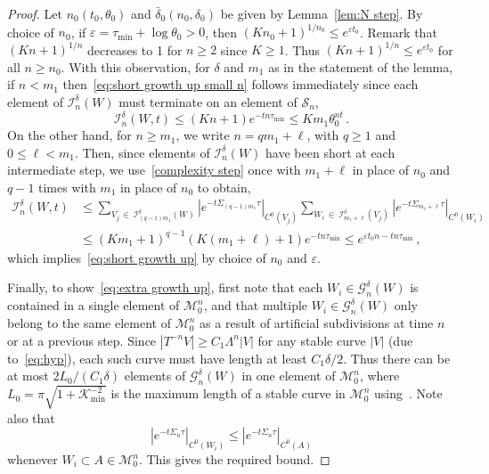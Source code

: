 \documentclass[AHL,Unicode,longabstracts,published]{cedram}
\newcommand{\cG}{\mathcal{G}}
\newcommand{\cI}{\mathcal{I}}
\newcommand{\cK}{\mathcal{K}}
\newcommand{\MM}{\mathcal{M}}
\newcommand{\cS}{\mathcal{S}}
\newcommand{\ve}{\varepsilon}
\begin{document}
\begin{proof}
Let $n_0(t_0,\theta_0)$ and $\bar\delta_0(n_0,\delta_0)$ be given by Lemma~\ref{lem:N step}. By choice of $n_0$, if $\ve = \tau_{\min} + \log \theta_0 > 0$, then $(Kn_0+1)^{1/n_0} \le e^{\ve t_0}$. Remark that $(Kn+1)^{1/n}$ decreases to 1 for $n \ge 2$ since $K \ge1$. Thus $(Kn+1)^{1/n} \le e^{\ve t_0}$ for all $n \ge n_0$. With this observation, for $\delta$ and $m_1$ as in the statement of the lemma, if $n < m_1$ then~\eqref{eq:short growth up small n} follows immediately since each element of $\cI^{\delta}_n(W)$ must terminate on an element of $\cS_{n}$,
\[
\cI^{\delta}_n(W,t) \le (Kn+1) e^{-tn \tau_{\min}} \le K m_1 \theta_0^{nt} \,.
\]
On the other hand, for $n \ge m_1$, we write $n = qm_1 + \ell$, with $q \ge 1$ and $0 \le \ell < m_1$. Then, since elements of $\cI_n^\delta(W)$ have been short at each intermediate step, we use~\eqref{complexity step} once with $m_1 + \ell$ in place of $n_0$ and $q-1$ times with $m_1$ in place of $n_0$ to obtain,
\begin{align*}
\cI^\delta_n(W, t) & \le \sum_{V_j\,\in\,\cI^\delta_{(q-1)m_1}(W)} \left| e^{-t \Sigma_{(q-1)m_1} \tau} \right|_{C^0(V_j)} \sum_{W_i\,\in\,\cI^\delta_{m_1+\ell}(V_j)} \left| e^{-t \Sigma_{m_1+\ell} \tau } \right|_{C^0(W_i)} \\
& \le (Km_1 +1)^{q-1}(K(m_1+\ell) + 1) e^{-t n \tau_{\min}} \le e^{\ve t_0 n - t n \tau_{\min}} \,,
\end{align*}
which implies~\eqref{eq:short growth up} by choice of $n_0$ and $\ve$.


Finally, to show~\eqref{eq:extra growth up}, first note that each $W_i \in \cG^\delta_n(W)$ is contained in a single element of $\MM_0^{n}$, and that multiple $W_i \in \cG^\delta_n(W)$ only belong to the same element of $\MM_0^n$ as a result of artificial subdivisions at time $n$ or at a previous step. Since $|T^{-n}V| \ge C_1 \Lambda^n |V|$ for any stable curve $|V|$ (due to~\eqref{eq:hyp}), each such curve must have length at least $C_1 \delta/2$. Thus there can be at most $2L_0/(C_1\delta)$ elements of $\cG^\delta_n(W)$ in one element of $\MM_0^{n}$, where $L_0 = \pi \sqrt{1 + \cK_{\min}^{-2}}$ is the maximum length of a stable curve in $\MM_0^n$ using~\cite[\S~3]{BD1}. Note also that
\[
\left|e^{-t \Sigma_n \tau}\right|_{C^0(W_i)} \le \left|e^{-t \Sigma_n \tau}\right|_{C^0(A)}
\]
whenever $W_i \subset A \in \MM_0^n$. This gives the required bound.
\end{proof}
\end{document}
